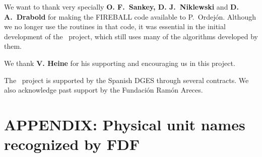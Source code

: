We want to thank very specially \textbf{O. F.\ Sankey, D. J.\ Niklewski}
and \textbf{D. A.\ Drabold} for making the FIREBALL code available to
P.\ Ordej\'on.  Although we no longer use the routines in that code,
it was essential in the initial development of the \siesta\
project, which still uses many of the algorithms developed by them.

We thank \textbf{V. Heine} for his supporting and encouraging us in this
project.

The \siesta\ project is supported by the Spanish DGES through
several contracts. We also acknowledge past support by the Fundaci\'on
Ram\'on Areces.



\section{APPENDIX: Physical unit names recognized by FDF}

